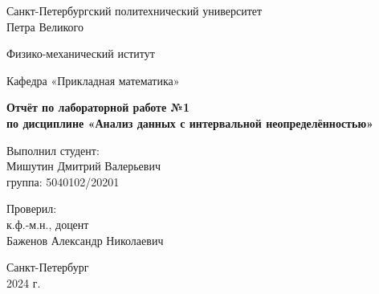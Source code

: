 \begin{titlepage}
  \begin{center}
    {\large Санкт-Петербургский политехнический университет\\Петра Великого\\}
  \end{center}

  \begin{center}
    {\large Физико-механический иститут}
  \end{center}


  \begin{center}
    {\large Кафедра «Прикладная математика»}
  \end{center}

  \vspace{8em}

  \begin{center}
    {\bfseries Отчёт по лабораторной работе №1 \\по дисциплине «Анализ данных с интервальной неопределённостью»}
  \end{center}

  \vspace{5em}

  \begin{flushleft}
    \hspace{16em}Выполнил студент:\\\hspace{16em}Мишутин Дмитрий Валерьевич\\\hspace{16em}группа: 5040102/20201

    \vspace{2em}

    \hspace{16em}Проверил:\\\hspace{16em}к.ф.-м.н., доцент\\\hspace{16em}Баженов Александр Николаевич

  \end{flushleft}


  \vspace{6em}


  \begin{center}
    Санкт-Петербург\\2024 г.
  \end{center}

\end{titlepage}
